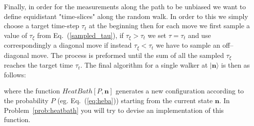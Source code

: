 Finally, in order for the measurements along the path to be unbiased we want to define equidistant "time-slices" along the random walk. In 
order to this we simply choose a target time-step $\tau_t$ at the beginning then for each move we first sample a value of $\tau_{\xi}$ 
from Eq.~(\eqref{sampled_tau}), if $\tau_{\xi} > \tau_t$ we set $\tau=\tau_t$ and use correspondingly a diagonal move if instead $\tau_{\xi} < \tau_t$ 
we have to sample an off--diagonal move. The process is preformed until the sum of all the sampled $\tau_{\xi}$ reaches the target time $\tau_t$. 
The final algorithm for a single walker at $\rvert \mathbf{n}\rangle$ is then as follows: 
\begin{svgraybox}
\begin{algorithmic} 
\Loop
  \If{$\tau_\xi\geq\tau$}
  \EndIf
  \State{$\tau\to\tau-\tau_\xi$}
\EndLoop
\end{algorithmic}
\end{svgraybox}
where the function $HeatBath[P,\mathbf{n}]$ generates a new configuration according to the probability $P$ (eg. Eq.~(\eqref{eq:heba})) starting 
from the current state $\mathbf{n}$. In Problem~\ref{prob:heatbath} you will try to devise an implementation of this function.

